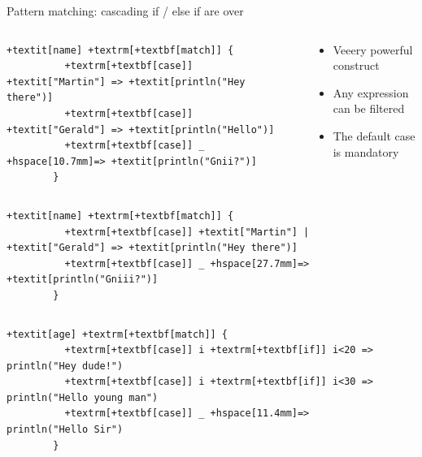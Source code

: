 \begin{frame}[fragile]{Pattern matching: cascading if / else if are over}
  
  \begin{columns}
    \begin{column}{.57\linewidth}
      \begin{Verbatim}[gobble=8,fontsize=\footnotesize,frame=single,commandchars=+[\]]
        +textit[name] +textrm[+textbf[match]] {
          +textrm[+textbf[case]] +textit["Martin"] => +textit[println("Hey there")]
          +textrm[+textbf[case]] +textit["Gerald"] => +textit[println("Hello")]
          +textrm[+textbf[case]] _ +hspace[10.7mm]=> +textit[println("Gnii?")]
        }
      \end{Verbatim}
    \end{column}
    \begin{column}{.42\linewidth}
      \begin{itemize}
      \item Veeery powerful construct
      \item Any expression can be filtered
      \item The default case is mandatory
      \end{itemize}
    \end{column}
  \end{columns}

  \begin{columns}
    \begin{column}{.73\linewidth}
      \begin{Verbatim}[gobble=8,fontsize=\footnotesize,frame=single,commandchars=+[\]]
        +textit[name] +textrm[+textbf[match]] {
          +textrm[+textbf[case]] +textit["Martin"] | +textit["Gerald"] => +textit[println("Hey there")]
          +textrm[+textbf[case]] _ +hspace[27.7mm]=> +textit[println("Gniii?")]
        }
      \end{Verbatim}      
    \end{column}
    \begin{column}{.265\linewidth}
      ~
    \end{column}
  \end{columns}

 \begin{columns}
    \begin{column}{.73\linewidth}
      \begin{Verbatim}[gobble=8,fontsize=\footnotesize,frame=single,commandchars=+[\]]
        +textit[age] +textrm[+textbf[match]] {
          +textrm[+textbf[case]] i +textrm[+textbf[if]] i<20 => println("Hey dude!")
          +textrm[+textbf[case]] i +textrm[+textbf[if]] i<30 => println("Hello young man")
          +textrm[+textbf[case]] _ +hspace[11.4mm]=> println("Hello Sir")
        }
      \end{Verbatim}      
    \end{column}
    \begin{column}{.265\linewidth}
      ~
    \end{column}
  \end{columns}


\end{frame}
